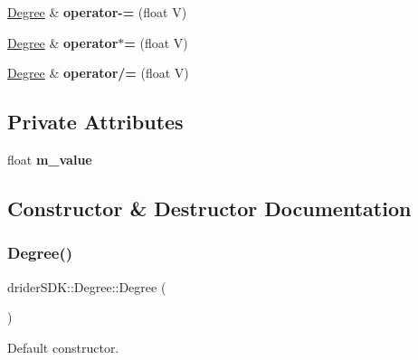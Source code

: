 \begin{DoxyCompactItemize}
\mbox{\label{classdrider_s_d_k_1_1_degree_a89b96313fb2d245b326378985d887aff}} 
\hyperlink{classdrider_s_d_k_1_1_degree}{Degree} \& {\bfseries operator-\/=} (float V)
\item 
\mbox{\label{classdrider_s_d_k_1_1_degree_a61bca4212d64c8676f6fd39956df7e3e}} 
\hyperlink{classdrider_s_d_k_1_1_degree}{Degree} \& {\bfseries operator$\ast$=} (float V)
\item 
\mbox{\label{classdrider_s_d_k_1_1_degree_a13d3186e5c614087168767a9090c501e}} 
\hyperlink{classdrider_s_d_k_1_1_degree}{Degree} \& {\bfseries operator/=} (float V)
\end{DoxyCompactItemize}
\subsection*{Private Attributes}
\begin{DoxyCompactItemize}
\item 
\mbox{\label{classdrider_s_d_k_1_1_degree_abdb67b756d1b1889833b05019b56f1d1}} 
float {\bfseries m\+\_\+value}
\end{DoxyCompactItemize}


\subsection{Constructor \& Destructor Documentation}
\mbox{\label{classdrider_s_d_k_1_1_degree_aa02a04e5e7f0c5d15e4362bfc2022286}} 
\subsubsection{\texorpdfstring{Degree()}{Degree()}\hspace{0.1cm}{\footnotesize\ttfamily [1/4]}}
{\footnotesize\ttfamily drider\+S\+D\+K\+::\+Degree\+::\+Degree (\begin{DoxyParamCaption}{ }\end{DoxyParamCaption})}

Default constructor. \mbox{\label{classdrider_s_d_k_1_1_degree_ab8798b0761abe03fd0d28abbac62a17c}} 
